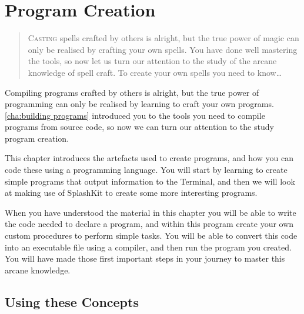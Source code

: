 \chapter{Program Creation} %
\label{cha:program_creation}

\begin{quote}
  \Fontlukas\Large
  \renewcommand{\LettrineTextFont}{\relax}
  \lettrine[image=true,lines=3,lraise=0.1]
  {C}{asting} spells crafted by others is alright, but the true power of magic can only be realised by crafting your own spells. You have done well mastering the tools, so now let us turn our attention to the study of the arcane knowledge of spell craft. To create your own spells you need to know\ldots
\end{quote}

\bigskip

Compiling programs crafted by others is alright, but the true power of programming can only be realised by learning to craft your own programs. \cref{cha:building programs} introduced you to the tools you need to compile programs from source code, so now we can turn our attention to the study program creation.

This chapter introduces the artefacts used to create programs, and how you can code these using a programming language. You will start by learning to create simple programs that output information to the Terminal, and then we will look at making use of SplashKit to create some more interesting programs.

When you have understood the material in this chapter you will be able to write the code needed to declare a program, and within this program create your own custom procedures to perform simple tasks. You will be able to convert this code into an executable file using a compiler, and then run the program you created. You will have made those first important steps in your journey to master this arcane knowledge. 

\minitoc




\clearpage
\section{Using these Concepts} %
\label{sec:using_these_concepts_program_creation}

